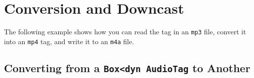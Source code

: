 \documentclass[
]{book}
\begin{document}
\hypertarget{conversion-and-downcast}{%
\chapter{Conversion and Downcast}\label{conversion-and-downcast}}

The following example shows how you can read the tag in an \texttt{mp3} file, convert it into an \texttt{mp4} tag, and write it to an \texttt{m4a} file.

\hypertarget{converting-from-a-boxdyn-audiotag-to-another}{%
\section{\texorpdfstring{Converting from a \texttt{Box\textless{}dyn\ AudioTag} to Another}{Converting from a Box\textless dyn AudioTag to Another}}\label{converting-from-a-boxdyn-audiotag-to-another}}
\end{document}
